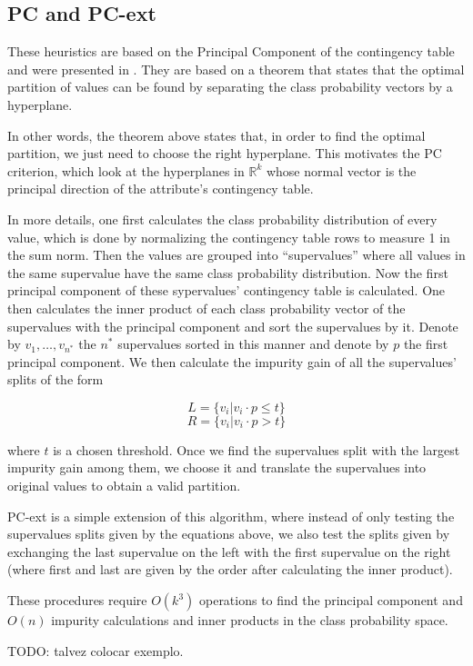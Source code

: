 \subsection{PC and PC-ext}
These heuristics are based on the Principal Component of the contingency table and were presented in \cite{journals/datamine/CoppersmithHH99}.
They are based on a theorem that states that the optimal partition of values can be found by separating the class probability vectors by a hyperplane.

In other words, the theorem above states that, in order to find the optimal partition, we just need to choose the right hyperplane. This motivates the PC criterion, which look at the hyperplanes in $\mathbb{R}^k$ whose normal vector is the principal direction of the attribute's contingency table.

In more details, one first calculates the class probability distribution of every value, which is done by normalizing the contingency table rows to measure 1 in the sum norm. Then the values are grouped into ``supervalues'' where all values in the same supervalue have the same class probability distribution. Now the first principal component of these sypervalues' contingency table is calculated. One then calculates the inner product of each class probability vector of the supervalues  with the principal component and sort the supervalues by it. Denote by $v_1,\ldots,v_{n^*}$ the $n^*$ supervalues sorted in this manner and denote by $p$ the first principal component. We then calculate the impurity gain of all the supervalues' splits of the form

$$L = \{v_i | v_i \cdot p \leq t\}$$
$$R = \{v_i | v_i \cdot p > t\}$$

where $t$ is a chosen threshold. Once we find the supervalues split with the largest impurity gain among them, we choose it and translate the supervalues into original values to obtain a valid partition.

PC-ext is a simple extension of this algorithm, where instead of only testing the supervalues splits given by the equations above, we also test the splits given by  exchanging the last supervalue on the left with the first supervalue on the right (where first and last are given by the order after calculating the inner product).

These procedures require $O(k^3)$ operations to find the principal component and $O(n)$ impurity calculations and inner products in the class probability space.


TODO: talvez colocar exemplo.

